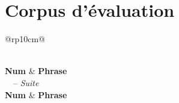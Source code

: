
\chapter{Corpus d'évaluation}


\begin{longtable}{@{}rp{10cm}@{}}
\caption{Phrases tirées de VerbNet pour l'évaluation}\\
\toprule
\textbf{Num} & \textbf{Phrase} \\
\midrule
\endfirsthead
{}%
{\tablename\ \thetable\ -- \textit{Suite}} \\
\toprule
\textbf{Num} & \textbf{Phrase} \\
\midrule
\endhead
\bottomrule {} \\
\endfoot
\bottomrule
\endlastfoot


\end{longtable}
